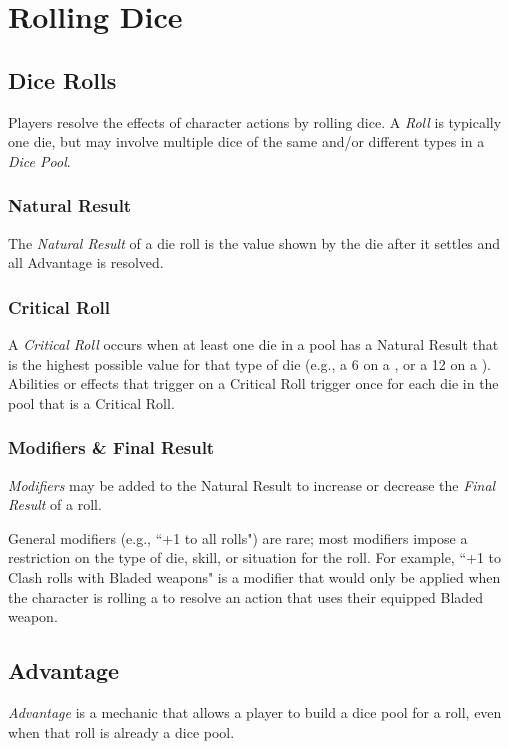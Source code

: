 
\chapter{Rolling Dice}



\section{Dice Rolls}
Players resolve the effects of character actions by rolling dice.
A \textit{Roll} is typically one die, but may involve multiple dice of the 
same and/or different types in a \textit{Dice Pool}.

\subsection{Natural Result}
The \textit{Natural Result} of a die roll is the value shown by the die 
after it settles and all Advantage is resolved.

\subsection{Critical Roll}
A \textit{Critical Roll} occurs when at least one die in a pool has a 
Natural Result that is the highest possible value for that type of die 
(e.g., a 6 on a , or a 12 on a ).
Abilities or effects that trigger on a Critical Roll trigger once 
for each die in the pool that is a Critical Roll.

\subsection{Modifiers \& Final Result}
\textit{Modifiers} may be added to the Natural Result 
to increase or decrease the \textit{Final Result} of a roll.

\begin{DesignerNote}
  General modifiers (e.g., ``+1 to all rolls") are rare; 
  most modifiers impose a restriction on the type of die, 
  skill, or situation for the roll.
  For example, ``+1 to Clash rolls with Bladed weapons" is a modifier 
  that would only be applied when the character is rolling a  
  to resolve an action that uses their equipped Bladed weapon.
\end{DesignerNote}



\section{Advantage}
\textit{Advantage} is a mechanic that allows a player to build a dice pool 
for a roll, even when that roll is already a dice pool.

